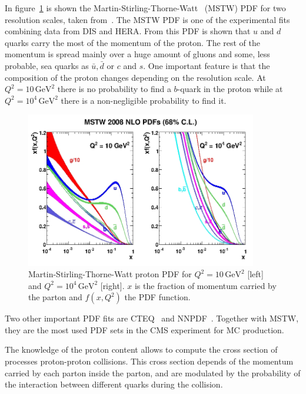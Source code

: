 In figure~\ref{fig:MSTW} is shown the Martin-Stirling-Thorne-Watt~\cite{Martin:2009iq} (MSTW) PDF for two resolution scales, taken from~\cite{Martin:2009iq}. The MSTW PDF is one of the experimental fits combining data from DIS and HERA. From this PDF is shown that $u$ and $d$ quarks carry the most of the momentum of the proton. The rest of the momentum is spread mainly over a huge amount of gluons and some, less probable, sea quarks as $\bar{u}, \bar{d}$ or $c$ and $s$. One important feature is that the composition of the proton changes depending on the resolution scale. At $Q^{2}= 10\, \text{GeV}^{2}$ there is no probability to find a $b$-quark in the proton while at $Q^{2}= 10^{4}\, \text{GeV}^{2}$ there is a non-negligible probability to find it.

\begin{figure}[!Hhtbp]
  \begin{center}
    \includegraphics[width=0.9\textwidth]{figs/mstw2008nlo68cl_allpdfs.jpg}
    \caption{Martin-Stirling-Thorne-Watt proton PDF for $Q^{2}= 10\, \text{GeV}^{2}$ [left] and $Q^{2}= 10^{4}\, \text{GeV}^{2}$ [right]. $x$ is the fraction of momentum carried by the parton and $f(x,Q^{2})$ the PDF function.}
    \label{fig:MSTW}
  \end{center}
\end{figure}

Two other important PDF fits are CTEQ~\cite{Nadolsky:2008zw} and NNPDF~\cite{Ball:2010de}. Together with MSTW, they are the most used PDF sets in the CMS experiment for MC production. 

The knowledge of the proton content allows to compute the cross section of processes proton-proton collisions. This cross section depends of the momentum carried by each parton inside the parton, and are modulated by the probability of the interaction between different quarks during the collision.

